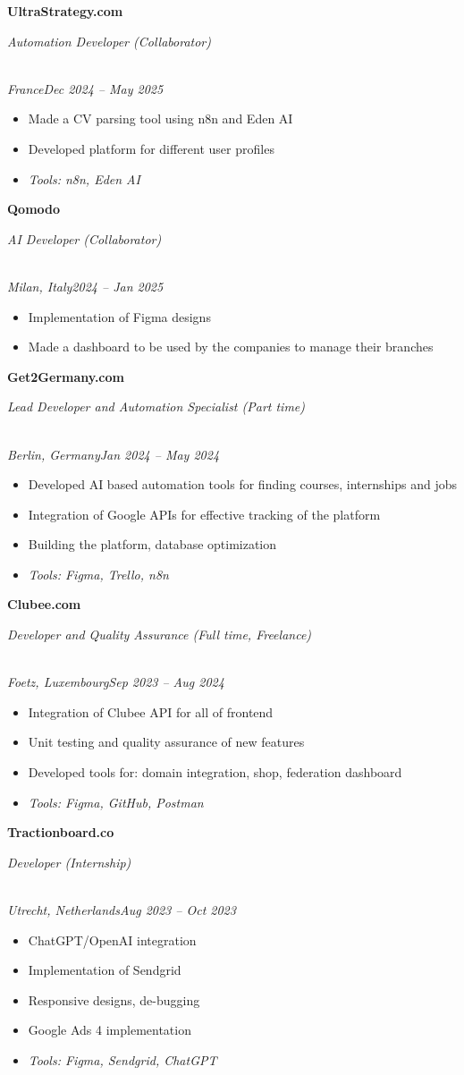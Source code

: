 \documentclass[a4paper,10pt]{article}
\newcommand{\role}[4]{\vspace{3pt}\noindent\hspace{0.6em}\parbox[t]{0.38\textwidth}{\raggedright\textbf{#1}}\hfill\parbox[t]{0.58\textwidth}{\raggedleft\textit{#2}}\\{\textit{#3}\hfill\textit{#4}}\vspace{1pt}}
\begin{document}
\role{UltraStrategy.com}{Automation Developer (Collaborator)}{France}{Dec 2024 -- May 2025}
\begin{itemize}
\item Made a CV parsing tool using n8n and Eden AI
\item Developed platform for different user profiles
\item \textit{Tools: n8n, Eden AI}
\end{itemize}

\role{Qomodo}{AI Developer (Collaborator)}{Milan, Italy}{2024 -- Jan 2025}
\begin{itemize}
\item Implementation of Figma designs
\item Made a dashboard to be used by the companies to manage their branches
\end{itemize}

\role{Get2Germany.com}{Lead Developer and Automation Specialist (Part time)}{Berlin, Germany}{Jan 2024 -- May 2024}
\begin{itemize}
\item Developed AI based automation tools for finding courses, internships and jobs
\item Integration of Google APIs for effective tracking of the platform
\item Building the platform, database optimization
\item \textit{Tools: Figma, Trello, n8n}
\end{itemize}

\role{Clubee.com}{Developer and Quality Assurance (Full time, Freelance)}{Foetz, Luxembourg}{Sep 2023 -- Aug 2024}
\begin{itemize}
\item Integration of Clubee API for all of frontend
\item Unit testing and quality assurance of new features
\item Developed tools for: domain integration, shop, federation dashboard
\item \textit{Tools: Figma, GitHub, Postman}
\end{itemize}

\role{Tractionboard.co}{Developer (Internship)}{Utrecht, Netherlands}{Aug 2023 -- Oct 2023}
\begin{itemize}
\item ChatGPT/OpenAI integration
\item Implementation of Sendgrid
\item Responsive designs, de-bugging
\item Google Ads 4 implementation
\item \textit{Tools: Figma, Sendgrid, ChatGPT}
\end{itemize}
\end{document}
